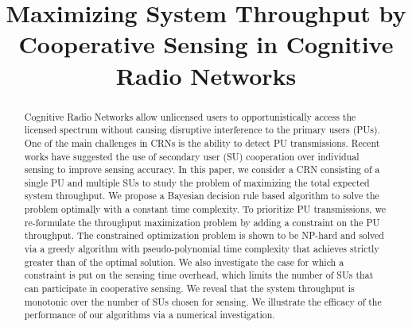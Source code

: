 \documentclass[conference]{IEEEtran}
\begin{document}
\title{Maximizing System Throughput by Cooperative Sensing in Cognitive Radio Networks}

\author{
\and
{}
\and
{}
\and
{}
}
\maketitle

\begin{abstract}
Cognitive Radio Networks allow unlicensed users to
opportunistically access the licensed spectrum without causing
disruptive interference to the primary users (PUs). One of the main
challenges in CRNs is the ability to detect PU transmissions. Recent
works have suggested the use of secondary user (SU) cooperation over
individual sensing to improve sensing accuracy. In this paper, we
consider a CRN consisting of a single PU and multiple SUs to study the
problem of maximizing the total expected system throughput. We propose
a Bayesian decision rule based algorithm to solve the problem
optimally with a constant time complexity. To prioritize PU
transmissions, we re-formulate the throughput maximization problem by
adding a constraint on the PU throughput. The constrained
optimization problem is shown to be NP-hard and solved via a greedy
algorithm with pseudo-polynomial time complexity that achieves strictly greater than  of the optimal solution. We also investigate
the case for which a constraint is put on the sensing time overhead,
which limits the number of SUs that can participate in cooperative
sensing. We reveal that the system throughput is monotonic over the
number of SUs chosen for sensing. We illustrate the efficacy of the
performance of our algorithms via a numerical investigation.
\end{abstract}
\end{document}
